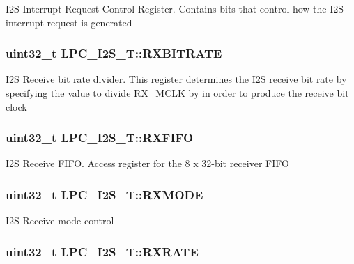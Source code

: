 I2\-S Interrupt Request Control Register. Contains bits that control how the I2\-S interrupt request is generated \hypertarget{structLPC__I2S__T_a3f0c2587313eb723ac48ad06af157df9}{
\subsubsection[{R\-X\-B\-I\-T\-R\-A\-T\-E}]{ uint32\-\_\-t L\-P\-C\-\_\-\-I2\-S\-\_\-\-T\-::\-R\-X\-B\-I\-T\-R\-A\-T\-E}}\label{structLPC__I2S__T_a3f0c2587313eb723ac48ad06af157df9}
I2\-S Receive bit rate divider. This register determines the I2\-S receive bit rate by specifying the value to divide R\-X\-\_\-\-M\-C\-L\-K by in order to produce the receive bit clock \hypertarget{structLPC__I2S__T_aac5c44248c1354eb4320eb5fa5b18baa}{
\subsubsection[{R\-X\-F\-I\-F\-O}]{ uint32\-\_\-t L\-P\-C\-\_\-\-I2\-S\-\_\-\-T\-::\-R\-X\-F\-I\-F\-O}}\label{structLPC__I2S__T_aac5c44248c1354eb4320eb5fa5b18baa}
I2\-S Receive F\-I\-F\-O. Access register for the 8 x 32-\/bit receiver F\-I\-F\-O \hypertarget{structLPC__I2S__T_a257e2de4bfa371adba9eeb4c2e95fe09}{
\subsubsection[{R\-X\-M\-O\-D\-E}]{ uint32\-\_\-t L\-P\-C\-\_\-\-I2\-S\-\_\-\-T\-::\-R\-X\-M\-O\-D\-E}}\label{structLPC__I2S__T_a257e2de4bfa371adba9eeb4c2e95fe09}
I2\-S Receive mode control \hypertarget{structLPC__I2S__T_a03d51065fa11a182809e189b919b034a}{
\subsubsection[{R\-X\-R\-A\-T\-E}]{ uint32\-\_\-t L\-P\-C\-\_\-\-I2\-S\-\_\-\-T\-::\-R\-X\-R\-A\-T\-E}}\label{structLPC__I2S__T_a03d51065fa11a182809e189b919b034a}
